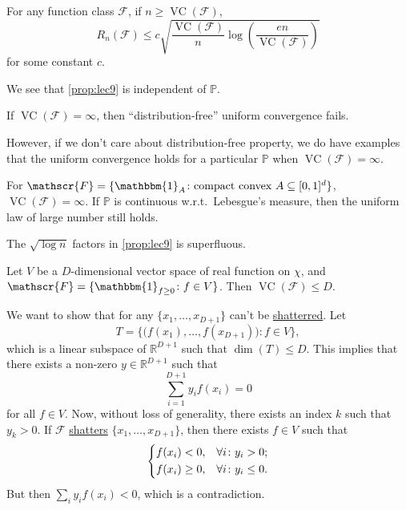\begin{proposition}\label{prop:lec9}
	For any function class \(\mathscr{F} \), if \(n \geq \mathop{\mathrm{VC}}(\mathscr{F} ) \),
	\[
		R_n(\mathscr{F} ) \leq c \sqrt{\frac{\mathop{\mathrm{VC}}(\mathscr{F} ) }{n} \log \left( \frac{en}{\mathop{\mathrm{VC}}(\mathscr{F} ) } \right) }
	\]
	for some constant \(c\).
\end{proposition}

\begin{remark}
	We see that \autoref{prop:lec9} is independent of \(\mathbb{P} \).
\end{remark}

\begin{remark}
	If \(\mathop{\mathrm{VC}}(\mathscr{F} ) = \infty \), then ``distribution-free'' uniform convergence fails.
\end{remark}

However, if we don't care about distribution-free property, we do have examples that the uniform convergence holds for a particular \(\mathbb{P} \) when \(\mathop{\mathrm{VC}}(\mathscr{F} ) = \infty \).

\begin{eg}
	For \(\mathscr{F} = \{ \mathbbm{1}_{A} \colon \text{compact convex } A \subseteq [0, 1]^d \} \), \(\mathop{\mathrm{VC}}(\mathscr{F} ) = \infty \). If \(\mathbb{P} \) is continuous w.r.t.\ Lebesgue's measure, then the uniform law of large number still holds.
\end{eg}

\begin{remark}
	The \(\sqrt{\log n} \) factors in \autoref{prop:lec9} is superfluous.
\end{remark}

\begin{eg}
	Let \(V\) be a \(D\)-dimensional vector space of real function on \(\chi \), and \(\mathscr{F} = \{ \mathbbm{1}_{f\geq 0} \colon f \in V\} \). Then \(\mathop{\mathrm{VC}}(\mathscr{F} ) \leq D\).
\end{eg}
\begin{explanation}
	We want to show that for any \(\{ x_1, \dots , x_{D+1} \} \) can't be \hyperref[def:shatter]{shatterred}. Let
	\[
		T = \{ \big( f(x_1), \dots , f(x_{D+1}) \big) \colon f\in V \},
	\]
	which is a linear subspace of \(\mathbb{R} ^{D+1}\) such that \(\dim (T) \leq D\). This implies that there exists a non-zero \(y \in \mathbb{R} ^{D+1}\) such that
	\[
		\sum_{i=1}^{D+1} y_i f(x_i) = 0
	\]
	for all \(f\in V\). Now, without loss of generality, there exists an index \(k\) such that \(y_k > 0\). If \(\mathscr{F} \) \hyperref[def:shatter]{shatters} \(\{ x_1, \dots , x_{D+1} \} \), then there exists \(f\in V\) such that
	\[
		\begin{dcases}
			f(x_i) < 0,    & \forall i\colon y_i > 0  ;  \\
			f(x_i) \geq 0, & \forall i\colon y_i \leq 0.
		\end{dcases}
	\]
	But then \(\sum_{i} y_i f(x_i) < 0\), which is a contradiction.
\end{explanation}

